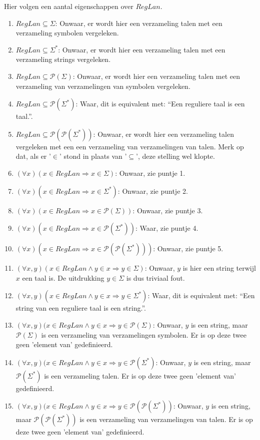\documentclass[main.tex]{subfiles}
\begin{document}
\begin{ei}
  Hier volgen een aantal eigenschappen over $RegLan$.
  \begin{enumerate}
  \item $RegLan \subseteq \Sigma$: Onwaar, er wordt hier een verzameling talen met een verzameling symbolen vergeleken.
  \item $RegLan \subseteq \Sigma^{*}$: Onwaar, er wordt hier een verzameling talen met een verzameling strings vergeleken.
  \item $RegLan \subseteq \mathcal P(\Sigma)$: Onwaar, er wordt hier een verzameling talen met een verzameling van verzamelingen van symbolen vergeleken.
  \item $RegLan \subseteq \mathcal P(\Sigma^{*})$: Waar, dit is equivalent met: ``Een reguliere taal is een taal.''.
  \item $RegLan \subseteq \mathcal P(\mathcal P(\Sigma^{*}))$: Onwaar, er wordt hier een verzameling talen vergeleken met een een verzameling van verzamelingen van talen. Merk op dat, als er '$\in$' stond in plaats van '$\subseteq$', deze stelling wel klopte.
  \item $(\forall x)(x \in RegLan \Rightarrow x \in \Sigma)$: Onwaar, zie puntje 1.
  \item $(\forall x)(x \in RegLan \Rightarrow x \in \Sigma^{*})$: Onwaar, zie puntje 2.
  \item $(\forall x)(x \in RegLan \Rightarrow x \in \mathcal P(\Sigma))$: Onwaar, zie puntje 3.
  \item $(\forall x)(x \in RegLan \Rightarrow x \in \mathcal P(\Sigma^{*}))$: Waar, zie puntje 4.
  \item $(\forall x)(x \in RegLan \Rightarrow x \in \mathcal P(\mathcal P(\Sigma^{*})))$: Onwaar, zie puntje 5.
  \item $(\forall x,y)(x \in RegLan \wedge y \in x \Rightarrow y \in \Sigma)$: Onwaar, $y$ is hier een string terwijl $x$ een taal is. De uitdrukking $y \in \Sigma$ is dus triviaal fout.
  \item $(\forall x,y)(x \in RegLan \wedge y \in x \Rightarrow y \in \Sigma^{*})$: Waar, dit is equivalent met: ``Een string van een reguliere taal is een string.''.
  \item $(\forall x,y)(x \in RegLan \wedge y \in x \Rightarrow y \in \mathcal P(\Sigma)$: Onwaar, $y$ is een string, maar $\mathcal P(\Sigma)$ is een verzameling van verzamelingen symbolen. Er is op deze twee geen 'element van' gedefinieerd.
  \item $(\forall x,y)(x \in RegLan \wedge y \in x \Rightarrow y \in \mathcal P(\Sigma^{*})$: Onwaar, $y$ is een string, maar $\mathcal P(\Sigma^{*})$ is een verzameling talen. Er is op deze twee geen 'element van' gedefinieerd.
  \item $(\forall x,y)(x \in RegLan \wedge y \in x \Rightarrow y \in \mathcal P(\mathcal P(\Sigma^{*}))$: Onwaar, $y$ is een string, maar $\mathcal P(\mathcal P(\Sigma^{*}))$ is een verzameling van verzamelingen van talen. Er is op deze twee geen 'element van' gedefinieerd.
  \end{enumerate}
\end{ei}
\end{document}
